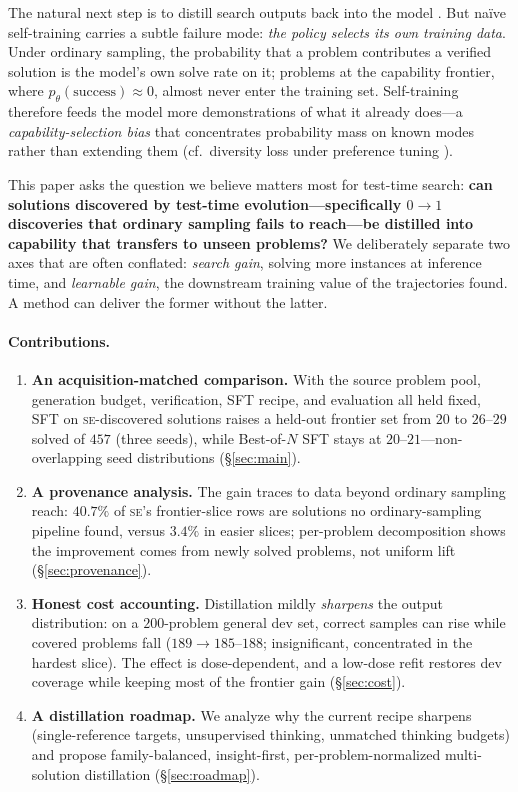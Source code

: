 \documentclass{article}
\newcommand{\se}{\textnormal{\textsc{se}}}
\begin{document}
The natural next step is to distill search outputs back into the model \citep{zelikman2022star, yuan2023scaling, gulcehre2023rest, singh2023beyond}. But na\"ive self-training carries a subtle failure mode: \emph{the policy selects its own training data}. Under ordinary sampling, the probability that a problem contributes a verified solution is the model's own solve rate on it; problems at the capability frontier, where $p_\theta(\text{success}) \approx 0$, almost never enter the training set. Self-training therefore feeds the model more demonstrations of what it already does---a \emph{capability-selection bias} that concentrates probability mass on known modes rather than extending them (cf.\ diversity loss under preference tuning \citep{kirk2024understanding}).

This paper asks the question we believe matters most for test-time search: \textbf{can solutions discovered by test-time evolution---specifically $0{\to}1$ discoveries that ordinary sampling fails to reach---be distilled into capability that transfers to unseen problems?} We deliberately separate two axes that are often conflated:
\emph{search gain}, solving more instances at inference time, and \emph{learnable gain}, the downstream training value of the trajectories found. A method can deliver the former without the latter.

\paragraph{Contributions.}
\begin{enumerate}[leftmargin=*, itemsep=1pt, topsep=2pt]
  \item \textbf{An acquisition-matched comparison.} With the source problem pool, generation budget, verification, SFT recipe, and evaluation all held fixed, SFT on \se{}-discovered solutions raises a held-out frontier set from $20$ to $26$--$29$ solved of $457$ (three seeds), while Best-of-$N$ SFT stays at $20$--$21$---non-overlapping seed distributions (\S\ref{sec:main}).
  \item \textbf{A provenance analysis.} The gain traces to data beyond ordinary sampling reach: $40.7\%$ of \se{}'s frontier-slice rows are solutions no ordinary-sampling pipeline found, versus $3.4\%$ in easier slices; per-problem decomposition shows the improvement comes from newly solved problems, not uniform lift (\S\ref{sec:provenance}).
  \item \textbf{Honest cost accounting.} Distillation mildly \emph{sharpens} the output distribution: on a $200$-problem general dev set, correct samples can rise while covered problems fall ($189 \to 185$--$188$; insignificant, concentrated in the hardest slice). The effect is dose-dependent, and a low-dose refit restores dev coverage while keeping most of the frontier gain (\S\ref{sec:cost}).
  \item \textbf{A distillation roadmap.} We analyze why the current recipe sharpens (single-reference targets, unsupervised thinking, unmatched thinking budgets) and propose family-balanced, insight-first, per-problem-normalized multi-solution distillation (\S\ref{sec:roadmap}).
\end{enumerate}
\end{document}

